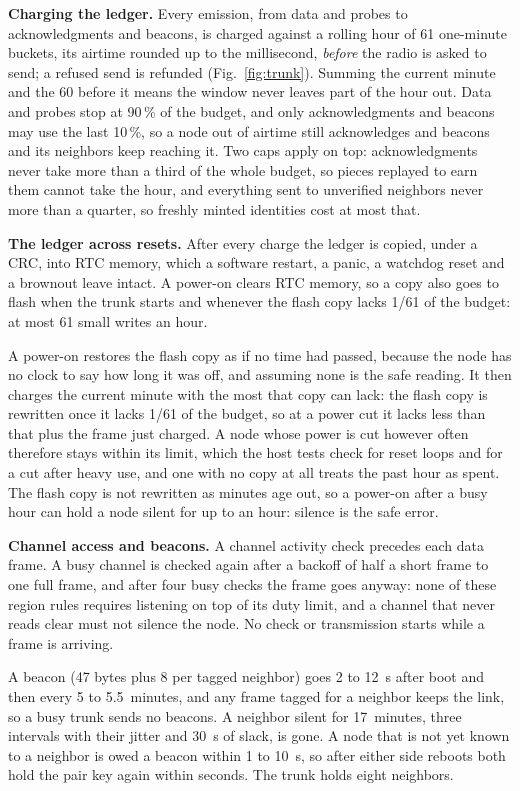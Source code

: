 \documentclass[conference]{IEEEtran}
\begin{document}
\textbf{Charging the ledger.} Every emission, from data and probes to acknowledgments and beacons, is charged against a rolling hour of 61 one-minute buckets, its airtime rounded up to the millisecond, \emph{before} the radio is asked to send; a refused send is refunded (Fig.~\ref{fig:trunk}). Summing the current minute and the 60 before it means the window never leaves part of the hour out. Data and probes stop at 90\,\% of the budget, and only acknowledgments and beacons may use the last 10\,\%, so a node out of airtime still acknowledges and beacons and its neighbors keep reaching it. Two caps apply on top: acknowledgments never take more than a third of the whole budget, so pieces replayed to earn them cannot take the hour, and everything sent to unverified neighbors never more than a quarter, so freshly minted identities cost at most that.

\textbf{The ledger across resets.} After every charge the ledger is copied, under a CRC, into RTC memory, which a software restart, a panic, a watchdog reset and a brownout leave intact. A power-on clears RTC memory, so a copy also goes to flash when the trunk starts and whenever the flash copy lacks 1/61 of the budget: at most 61 small writes an hour.

A power-on restores the flash copy as if no time had passed, because the node has no clock to say how long it was off, and assuming none is the safe reading. It then charges the current minute with the most that copy can lack: the flash copy is rewritten once it lacks 1/61 of the budget, so at a power cut it lacks less than that plus the frame just charged. A node whose power is cut however often therefore stays within its limit, which the host tests check for reset loops and for a cut after heavy use, and one with no copy at all treats the past hour as spent. The flash copy is not rewritten as minutes age out, so a power-on after a busy hour can hold a node silent for up to an hour: silence is the safe error.

\textbf{Channel access and beacons.} A channel activity check precedes each data frame. A busy channel is checked again after a backoff of half a short frame to one full frame, and after four busy checks the frame goes anyway: none of these region rules requires listening on top of its duty limit, and a channel that never reads clear must not silence the node. No check or transmission starts while a frame is arriving.

A beacon (47 bytes plus 8 per tagged neighbor) goes 2 to 12~s after boot and then every 5 to 5.5~minutes, and any frame tagged for a neighbor keeps the link, so a busy trunk sends no beacons. A neighbor silent for 17~minutes, three intervals with their jitter and 30~s of slack, is gone. A node that is not yet known to a neighbor is owed a beacon within 1 to 10~s, so after either side reboots both hold the pair key again within seconds. The trunk holds eight neighbors.
\end{document}
